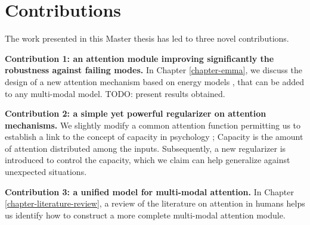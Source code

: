 
\section{Contributions}
The work presented in this Master thesis has led to three novel contributions.
\begin{description}
\item \textbf{Contribution 1: an attention module improving significantly the robustness against failing modes.} In Chapter \ref{chapter-emma}, we discuss the design of a new attention mechanism based on energy models \citep{ebm-tutorial}, that can be added to any multi-modal model. TODO: present results obtained.
\item \textbf{Contribution 2: a simple yet powerful regularizer on attention mechanisms.} We slightly modify a common attention function permitting us to establish a link to the concept of capacity in psychology \citep{attention-is-effort}; Capacity is the amount of attention distributed among the inputs. Subsequently, a new regularizer is introduced to control the capacity, which we claim can help generalize against unexpected situations.
\item \textbf{Contribution 3: a unified model for multi-modal attention.} In Chapter \ref{chapter-literature-review}, a review of the literature on attention in humans helps us identify how to construct a more complete multi-modal attention module.
\end{description}


